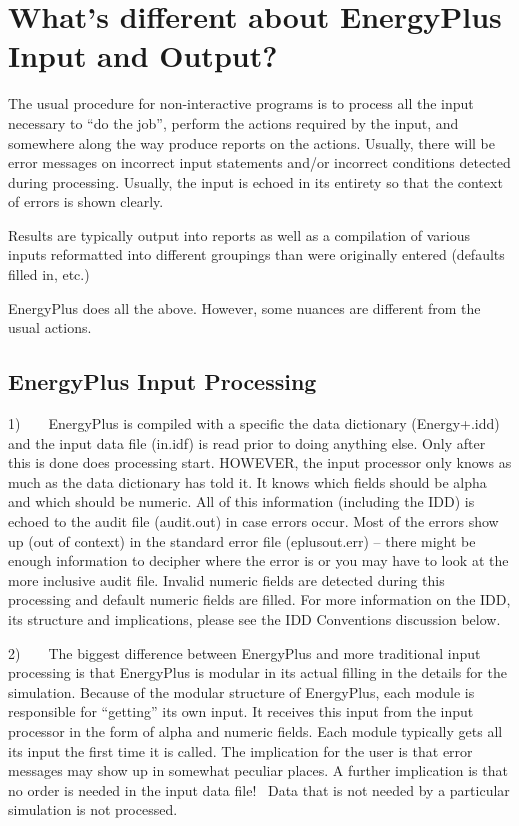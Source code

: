 \section{What's different about EnergyPlus Input and Output?}\label{whats-different-about-energyplus-input-and-output}

The usual procedure for non-interactive programs is to process all the input necessary to ``do the job'', perform the actions required by the input, and somewhere along the way produce reports on the actions. Usually, there will be error messages on incorrect input statements and/or incorrect conditions detected during processing. Usually, the input is echoed in its entirety so that the context of errors is shown clearly.

Results are typically output into reports as well as a compilation of various inputs reformatted into different groupings than were originally entered (defaults filled in, etc.)

EnergyPlus does all the above. However, some nuances are different from the usual actions.

\subsection{EnergyPlus Input Processing}\label{energyplus-input-processing}

1)~~~~EnergyPlus is compiled with a specific the data dictionary (Energy+.idd) and the input data file (in.idf) is read prior to doing anything else. Only after this is done does processing start. HOWEVER, the input processor only knows as much as the data dictionary has told it. It knows which fields should be alpha and which should be numeric. All of this information (including the IDD) is echoed to the audit file (audit.out) in case errors occur. Most of the errors show up (out of context) in the standard error file (eplusout.err) -- there might be enough information to decipher where the error is or you may have to look at the more inclusive audit file. Invalid numeric fields are detected during this processing and default numeric fields are filled. For more information on the IDD, its structure and implications, please see the IDD Conventions discussion below.

2)~~~~The biggest difference between EnergyPlus and more traditional input processing is that EnergyPlus is modular in its actual filling in the details for the simulation. Because of the modular structure of EnergyPlus, each module is responsible for ``getting'' its own input. It receives this input from the input processor in the form of alpha and numeric fields. Each module typically gets all its input the first time it is called. The implication for the user is that error messages may show up in somewhat peculiar places. A further implication is that no order is needed in the input data file!~ Data that is not needed by a particular simulation is not processed.

